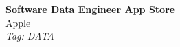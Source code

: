 \documentclass[11pt]{article}
\begin{document}
\begin{center}
  {\LARGE \textbf{Software Data Engineer App Store}} \\[4pt]
  {\large Apple} \\[2pt]
  {\small \textit{Tag: DATA}}
\end{center}

\vspace{1em}
\noindent
\end{document}
